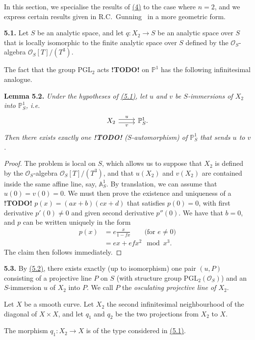 \documentclass{report}
\newenvironment{itenv}[1]
  {\phantomsection\par\medskip\noindent\textbf{#1.}\itshape}
  {\medskip}
\newenvironment{rmenv}[1]
  {\phantomsection\par\medskip\noindent\textbf{#1.}\rmfamily}
  {\medskip}
\renewcommand{\cal}[1]{{\mathcal{#1}}}
\newcommand{\PP}{\mathbb{P}}
\renewcommand{\AA}{\mathbb{A}}
\newcommand{\todo}{\textbf{ !TODO! }}
\newcommand{\oldpage}[1]{\marginpar{\footnotesize$\Big\vert$ \textit{p.~#1}}}
\begin{document}
In this section, we specialise the results of \hyperref[I.4]{(4)} to the case where $n=2$, and we express certain results given in R.C.~Gunning~\cite{11} in a more geometric form.

\begin{rmenv}{5.1}
\label{I.5.1}
  Let $S$ be an analytic space, and let $q\colon X_2\to S$ be an analytic space over $S$ that is locally isomorphic to the finite analytic space over $S$ defined by the $\cal{O}_S$-algebra $\cal{O}_S[T]/(T^3)$.

  The fact that the group $\mathrm{PGL}_2$ acts \todo on $\PP^1$ has the following infinitesimal analogue.
\end{rmenv}

\begin{itenv}{Lemma 5.2}
\label{I.5.2}
  Under the hypotheses of \hyperref[I.5.1]{(5.1)}, let $u$ and $v$ be $S$-immersions of $X_2$ into $\PP_S^1$, i.e.
  \[
    \begin{tikzcd}
      X_2 \rar[shift left=1,"u"] \rar[shift right=1,swap,"v"]
      & \PP_S^1.
    \end{tikzcd}
  \]
  Then there exists exactly one \todo ($S$-automorphism) of $\PP_S^1$ that sends $u$ to $v$.
\end{itenv}

\begin{proof}
  The problem is local on $S$, which allows us to suppose that $X_2$ is defined by the $\cal{O}_S$-algebra $\cal{O}_S[T]/(T^3)$, and that $u(X_2)$ and $v(X_2)$ are contained inside the same affine line, say, $\AA_S^1$.
  By translation, we can assume that $u(0)=v(0)=0$.
  We must then prove the existence and uniqueness of a \todo $p(x)=(ax+b)(cx+d)$ that satisfies $p(0)=0$, with first derivative $p'(0)\neq0$ and given second derivative $p''(0)$.
  We have that $b=0$, and $p$ can be written uniquely in the form
\oldpage{30}
  \[
    \begin{aligned}
      p(x)
      &= e\frac{x}{1-fx} \qquad\mbox{(for $e\neq0$)}
    \\&= ex + efx^2 \mod x^3.
    \end{aligned}
  \]
  The claim then follows immediately.
\end{proof}

\begin{rmenv}{5.3}
\label{I.5.3}
  By \hyperref[I.5.2]{(5.2)}, there exists exactly (up to isomorphism) one pair $(u,P)$ consisting of a projective line $P$ on $S$ (with structure group $\mathrm{PGL}_2(\cal{O}_S)$) and an $S$-immersion $u$ of $X_2$ into $P$.
  We call $P$ the \emph{osculating projective line of $X_2$}.

  Let $X$ be a smooth curve.
  Let $X_2$ the second infinitesimal neighbourhood of the diagonal of $X\times X$, and let $q_1$ and $q_2$ be the two projections from $X_2$ to $X$.

  The morphism $q_1\colon X_2\to X$ is of the type considered in \hyperref[I.5.1]{(5.1)}.
\end{rmenv}
\end{document}
